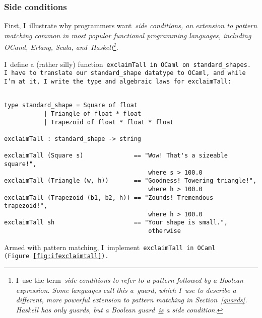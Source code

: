 \documentclass[manuscript,screen 12pt, nonacm]{acmart}
\begin{document}
\subsubsection{Side conditions}

    First, I~illustrate why programmers want~\it{side conditions}, an extension
    to pattern matching common in most popular functional programming languages,
    including OCaml, Erlang, Scala, and~Haskell\footnote{I~use the term~\it{side
    conditions} to refer to a pattern followed by a Boolean expression. Some
    languages call this a~\it{guard}, which I~use to describe a different, more
    powerful extension to pattern matching in Section~\ref{guards}. Haskell has
    \it{only} guards, but a Boolean guard~\underline{is} a side condition.}. 
    
    I~define a (rather silly) function~\tt{exclaimTall} in OCaml on
    \tt{standard\_shape}s. I~have to translate our~\tt{standard\_shape} datatype to OCaml, and
    while I'm at it, I~write the type and algebraic laws for
    \tt{exclaimTall}:

    \begin{minipage}[t]{\textwidth}        
        \centering 
        \begin{verbatim}

type standard_shape = Square of float 
           | Triangle of float * float
           | Trapezoid of float * float * float

exclaimTall : standard_shape -> string 

exclaimTall (Square s)              == "Wow! That's a sizeable square!", 
                                        where s > 100.0
exclaimTall (Triangle (w, h))       == "Goodness! Towering triangle!",
                                        where h > 100.0
exclaimTall (Trapezoid (b1, b2, h)) == "Zounds! Tremendous trapezoid!", 
                                        where h > 100.0
exclaimTall sh                      == "Your shape is small.", 
                                        otherwise
    \end{verbatim}
    \end{minipage}

    Armed with pattern matching, I~implement~\tt{exclaimTall} in OCaml
    (Figure~\ref{fig:ifexclaimtall}).
\end{document}
